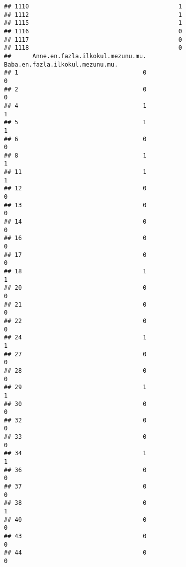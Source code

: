 \documentclass[
]{article}
\begin{document}
\begin{verbatim}
## 1110                                          1
## 1112                                          1
## 1115                                          1
## 1116                                          0
## 1117                                          0
## 1118                                          0
##      Anne.en.fazla.ilkokul.mezunu.mu. Baba.en.fazla.ilkokul.mezunu.mu.
## 1                                   0                                0
## 2                                   0                                0
## 4                                   1                                1
## 5                                   1                                1
## 6                                   0                                0
## 8                                   1                                1
## 11                                  1                                1
## 12                                  0                                0
## 13                                  0                                0
## 14                                  0                                0
## 16                                  0                                0
## 17                                  0                                0
## 18                                  1                                1
## 20                                  0                                0
## 21                                  0                                0
## 22                                  0                                0
## 24                                  1                                1
## 27                                  0                                0
## 28                                  0                                0
## 29                                  1                                1
## 30                                  0                                0
## 32                                  0                                0
## 33                                  0                                0
## 34                                  1                                1
## 36                                  0                                0
## 37                                  0                                0
## 38                                  0                                1
## 40                                  0                                0
## 43                                  0                                0
## 44                                  0                                0

\end{verbatim}
\end{document}
